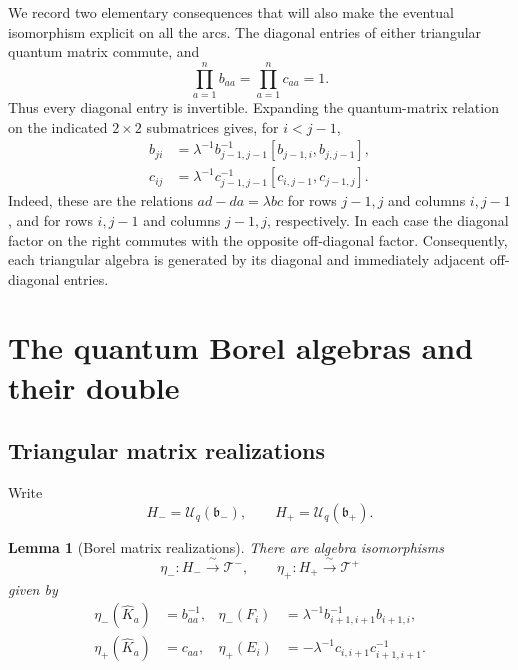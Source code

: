 \documentclass[11pt]{article}
\newtheorem{lemma}[theorem]{Lemma}
\theoremstyle{remark}
\newcommand{\UU}{\mathcal U_q}
\newcommand{\bplus}{\mathfrak b_+}
\newcommand{\bminus}{\mathfrak b_-}
\begin{document}
We record two elementary consequences that will also make the
eventual isomorphism explicit on all the arcs.  The diagonal
entries of either triangular quantum matrix commute, and
\begin{equation}\label{eq:diagonal-units}
 \prod_{a=1}^n b_{aa}=\prod_{a=1}^n c_{aa}=1.
\end{equation}
Thus every diagonal entry is invertible.  Expanding the
quantum-matrix relation on the indicated $2\times2$ submatrices
gives, for $i<j-1$,
\begin{align}
 b_{ji}
 &=\lambda^{-1}b_{j-1,j-1}^{-1}
     [b_{j-1,i},b_{j,j-1}],
 \label{eq:lower-recursion}\\
 c_{ij}
 &=\lambda^{-1}c_{j-1,j-1}^{-1}
     [c_{i,j-1},c_{j-1,j}].
 \label{eq:upper-recursion}
\end{align}
Indeed, these are the relations $ad-da=\lambda bc$ for rows
$j-1,j$ and columns $i,j-1$, and for rows $i,j-1$ and columns
$j-1,j$, respectively.  In each case the diagonal factor on the
right commutes with the opposite off-diagonal factor.
Consequently, each triangular algebra is generated by its diagonal
and immediately adjacent off-diagonal entries.

\section{The quantum Borel algebras and their double}

\subsection{Triangular matrix realizations}

Write
\[
 H_-=\UU(\bminus),\qquad H_+=\UU(\bplus).
\]

\begin{lemma}[Borel matrix realizations]\label{lem:borel}
There are algebra isomorphisms
\[
 \eta_-:H_-\xrightarrow{\ \sim\ }\mathcal T^-,
 \qquad
 \eta_+:H_+\xrightarrow{\ \sim\ }\mathcal T^+
\]
given by
\begin{align}
 \eta_-(\widehat K_a)&=b_{aa}^{-1},
 &
 \eta_-(F_i)&=\lambda^{-1}b_{i+1,i+1}^{-1}b_{i+1,i},
 \label{eq:eta-minus}\\
 \eta_+(\widehat K_a)&=c_{aa},
 &
 \eta_+(E_i)&=-\lambda^{-1}c_{i,i+1}c_{i+1,i+1}^{-1}.
 \label{eq:eta-plus}
\end{align}
\end{lemma}
\end{document}

